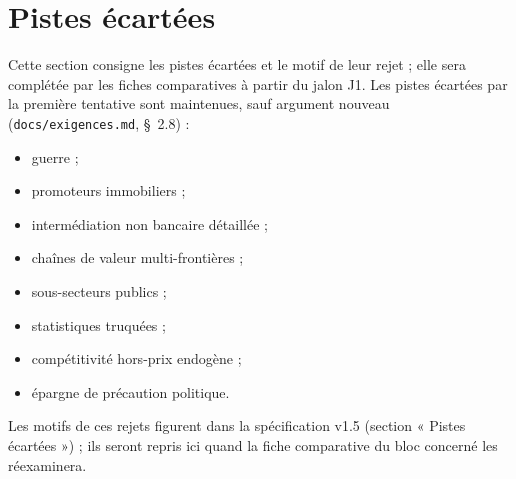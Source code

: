 \documentclass[11pt,a4paper]{article}
\begin{document}
\section{Pistes écartées}
\label{sec:ecartees}
Cette section consigne les pistes écartées et le motif de leur rejet ; elle sera complétée par les fiches comparatives à partir du jalon J1. Les pistes écartées par la première tentative sont maintenues, sauf argument nouveau (\nolinkurl{docs/exigences.md}, \S~2.8) :
\begin{itemize}
\item guerre ;
\item promoteurs immobiliers ;
\item intermédiation non bancaire détaillée ;
\item chaînes de valeur multi-frontières ;
\item sous-secteurs publics ;
\item statistiques truquées ;
\item compétitivité hors-prix endogène ;
\item épargne de précaution politique.
\end{itemize}
Les motifs de ces rejets figurent dans la spécification v1.5 (section « Pistes écartées ») ; ils seront repris ici quand la fiche comparative du bloc concerné les réexaminera.
\end{document}
